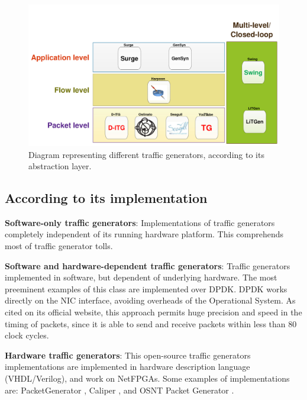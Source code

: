 \begin{figure}[!ht]
	\centering
	\includegraphics[scale=0.4]{figures/ch2/types-workload-tools}
	\caption{Diagram representing different traffic generators, according to its abstraction layer.}
	\label{fig:layers-workload-tools}
\end{figure}


\subsection{According to its implementation}

\textbf{Software-only traffic generators}: Implementations of traffic generators completely independent of its running hardware platform. This comprehends most of traffic generator tolls.

\textbf{Software and hardware-dependent traffic generators}: Traffic generators implemented in software, but dependent of underlying hardware. The most preeminent examples of this class are implemented over DPDK\cite{web-dpdk}. DPDK works directly on the NIC interface, avoiding overheads of the Operational System. As cited on its official website, this approach permits huge precision and speed in the timing of packets, since it is able to send and receive packets within less than 80 clock cycles.

\textbf{Hardware traffic generators}: This open-source traffic generators implementations are implemented in hardware description language (VHDL/Verilog), and work on NetFPGAs. Some examples of implementations are: PacketGenerator \cite{web-netfpgapacketgenerator}, Caliper \cite{web-caliper}, and OSNT Packet Generator \cite{web-osnt}.



